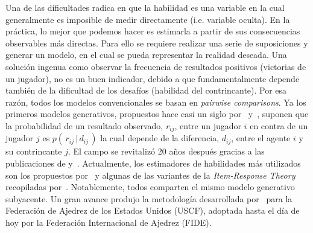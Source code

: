 \documentclass[11pt,twoside,spanish]{report} %
\begin{document}
Una de las dificultades radica en que la habilidad es una variable en la cual generalmente es imposible de medir directamente (i.e. variable oculta).
En la pr\'actica, lo mejor que podemos hacer es estimarla a partir de sus consecuencias observables m\'as directas.
Para ello se requiere realizar una serie de suposiciones y generar un modelo, en el cual se pueda representar la realidad deseada.
Una soluci\'on ingenua como observar la frecuencia de resultados positivos (victorias de un jugador), no es un buen indicador, debido a que fundamentalmente depende tambi\'en de la dificultad de los desaf\'ios (habilidad del contrincante).
Por esa raz\'on, todos los modelos convencionales se basan en \emph{pairwise comparisons}.
Ya los primeros modelos generativos, propuestos hace casi un siglo por~\cite{thurstone1927-comparativeJugement} y~\cite{Zermelo1929}, suponen que la probabilidad de un resultado observado, $r_{ij}$, entre un jugador $i$ en contra de un jugador $j$ es $p(\,r_{ij} \,|\, d_{ij}\,)$ la cual depende de la diferencia, $d_{ij}$, entre el agente $i$ y su contrincante $j$.
El campo se revitaliz\'o 20 a\~nos despu\'es gracias a las publicaciones de \cite{bradley1952} y~\cite{mosteller1951a}.
Actualmente, los estimadores de habilidades m\'as utilizados son los propuestos por~\cite{elo1961-uscf,glikman_gliko_2,Herbrich2007} y algunas de las variantes de la \emph{Item-Response Theory} recopiladas por~\cite{vanDerLinden2016,fox2010}.
Notablemente, todos comparten el mismo modelo generativo subyacente.
Un gran avance produjo la metodolog\'ia desarrollada por~\cite{elo1961-uscf} para la Federaci\'on de Ajedrez de los Estados Unidos (USCF), adoptada hasta el d\'ia de hoy por la Federaci\'on Internacional de Ajedrez (FIDE).
\end{document}
